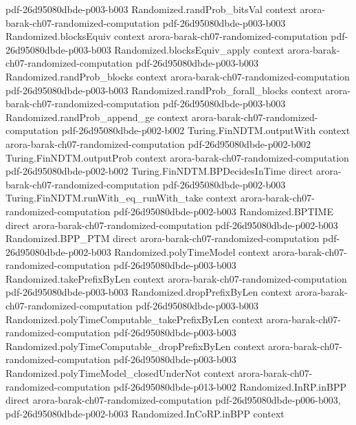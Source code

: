 \begin{theorem}
  {pdf-26d95080dbde-p003-b003}
\proofstep
  {Randomized.randProb_bitsVal}
  {context}
  {arora-barak-ch07-randomized-computation}
  {pdf-26d95080dbde-p003-b003}
\proofstep
  {Randomized.blocksEquiv}
  {context}
  {arora-barak-ch07-randomized-computation}
  {pdf-26d95080dbde-p003-b003}
\proofstep
  {Randomized.blocksEquiv_apply}
  {context}
  {arora-barak-ch07-randomized-computation}
  {pdf-26d95080dbde-p003-b003}
\proofstep
  {Randomized.randProb_blocks}
  {context}
  {arora-barak-ch07-randomized-computation}
  {pdf-26d95080dbde-p003-b003}
\proofstep
  {Randomized.randProb_forall_blocks}
  {context}
  {arora-barak-ch07-randomized-computation}
  {pdf-26d95080dbde-p003-b003}
\proofstep
  {Randomized.randProb_append_ge}
  {context}
  {arora-barak-ch07-randomized-computation}
  {pdf-26d95080dbde-p002-b002}
\proofstep
  {Turing.FinNDTM.outputWith}
  {context}
  {arora-barak-ch07-randomized-computation}
  {pdf-26d95080dbde-p002-b002}
\proofstep
  {Turing.FinNDTM.outputProb}
  {context}
  {arora-barak-ch07-randomized-computation}
  {pdf-26d95080dbde-p002-b002}
\proofstep
  {Turing.FinNDTM.BPDecidesInTime}
  {direct}
  {arora-barak-ch07-randomized-computation}
  {pdf-26d95080dbde-p002-b003}
\proofstep
  {Turing.FinNDTM.runWith_eq_runWith_take}
  {context}
  {arora-barak-ch07-randomized-computation}
  {pdf-26d95080dbde-p002-b003}
\proofstep
  {Randomized.BPTIME}
  {direct}
  {arora-barak-ch07-randomized-computation}
  {pdf-26d95080dbde-p002-b003}
\proofstep
  {Randomized.BPP_PTM}
  {direct}
  {arora-barak-ch07-randomized-computation}
  {pdf-26d95080dbde-p002-b003}
\proofstep
  {Randomized.polyTimeModel}
  {context}
  {arora-barak-ch07-randomized-computation}
  {pdf-26d95080dbde-p003-b003}
\proofstep
  {Randomized.takePrefixByLen}
  {context}
  {arora-barak-ch07-randomized-computation}
  {pdf-26d95080dbde-p003-b003}
\proofstep
  {Randomized.dropPrefixByLen}
  {context}
  {arora-barak-ch07-randomized-computation}
  {pdf-26d95080dbde-p003-b003}
\proofstep
  {Randomized.polyTimeComputable_takePrefixByLen}
  {context}
  {arora-barak-ch07-randomized-computation}
  {pdf-26d95080dbde-p003-b003}
\proofstep
  {Randomized.polyTimeComputable_dropPrefixByLen}
  {context}
  {arora-barak-ch07-randomized-computation}
  {pdf-26d95080dbde-p003-b003}
\proofstep
  {Randomized.polyTimeModel_closedUnderNot}
  {context}
  {arora-barak-ch07-randomized-computation}
  {pdf-26d95080dbde-p013-b002}
\proofstep
  {Randomized.InRP.inBPP}
  {direct}
  {arora-barak-ch07-randomized-computation}
  {pdf-26d95080dbde-p006-b003,
    pdf-26d95080dbde-p002-b003}
\proofstep
  {Randomized.InCoRP.inBPP}
  {context}

\end{theorem}
